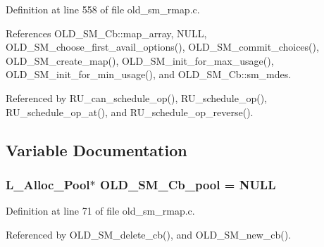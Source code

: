 Definition at line 558 of file old\_\-sm\_\-rmap.c.

References OLD\_\-SM\_\-Cb::map\_\-array, NULL, OLD\_\-SM\_\-choose\_\-first\_\-avail\_\-options(), OLD\_\-SM\_\-commit\_\-choices(), OLD\_\-SM\_\-create\_\-map(), OLD\_\-SM\_\-init\_\-for\_\-max\_\-usage(), OLD\_\-SM\_\-init\_\-for\_\-min\_\-usage(), and OLD\_\-SM\_\-Cb::sm\_\-mdes.

Referenced by RU\_\-can\_\-schedule\_\-op(), RU\_\-schedule\_\-op(), RU\_\-schedule\_\-op\_\-at(), and RU\_\-schedule\_\-op\_\-reverse().

\subsection{Variable Documentation}
\subsubsection{\setlength{\rightskip}{0pt plus 5cm}\bf{L\_\-Alloc\_\-Pool}$\ast$ \bf{OLD\_\-SM\_\-Cb\_\-pool} = \bf{NULL}\hspace{0.3cm}{\tt  [static]}}\label{old__sm__rmap_8c_d314575f4cc77999cbc830d8a6405daa}




Definition at line 71 of file old\_\-sm\_\-rmap.c.

Referenced by OLD\_\-SM\_\-delete\_\-cb(), and OLD\_\-SM\_\-new\_\-cb().